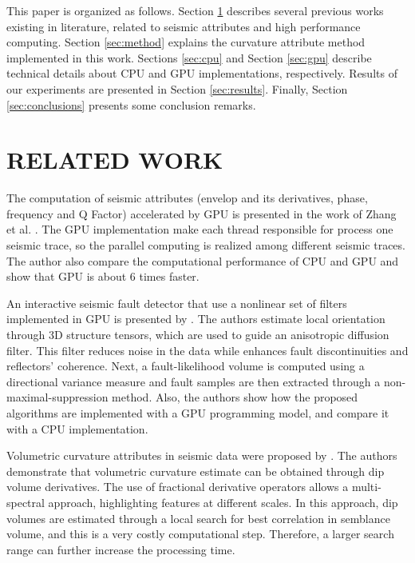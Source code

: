 \documentclass[conference]{IEEEtran}
\begin{document}
This paper is organized as follows. Section \ref{sec:work} describes several previous works existing in literature, related to seismic attributes and high performance computing. Section \ref{sec:method} explains the curvature attribute method implemented in this work. Sections \ref{sec:cpu} and Section \ref{sec:gpu} describe technical details about CPU and GPU implementations, respectively. Results of our experiments are presented in Section \ref{sec:results}. Finally, Section \ref{sec:conclusions} presents some conclusion remarks.

\section{RELATED WORK} \label{sec:work}

The computation of seismic attributes (envelop and its derivatives, phase, frequency and Q Factor) accelerated by GPU is presented in the work of Zhang et al. \cite{zhang}. The GPU implementation make each thread responsible for process one seismic trace, so the parallel computing is realized among different seismic traces. The author also compare the computational performance of CPU and GPU and show that GPU is about 6 times faster.

An interactive seismic fault detector that use a nonlinear set of filters implemented in GPU is presented by \cite{jeong}. The authors estimate local orientation through 3D structure tensors, which are used to guide an anisotropic diffusion filter. This filter reduces noise in the data while enhances fault discontinuities and reflectors' coherence. Next, a fault-likelihood volume is computed using a directional variance measure and fault samples are then extracted through a non-maximal-suppression method. Also, the authors show how the proposed algorithms are implemented with a GPU programming model, and compare it with a CPU implementation.

Volumetric curvature attributes in seismic data were proposed by \cite{dossary}. The authors demonstrate that volumetric curvature estimate can be obtained through dip volume derivatives. The use of fractional derivative operators allows a multi-spectral approach, highlighting features at different scales. In this approach, dip volumes are estimated through a local search for best correlation in semblance volume, and this is a very costly computational step. Therefore, a larger search range can further increase the processing time.
\end{document}
